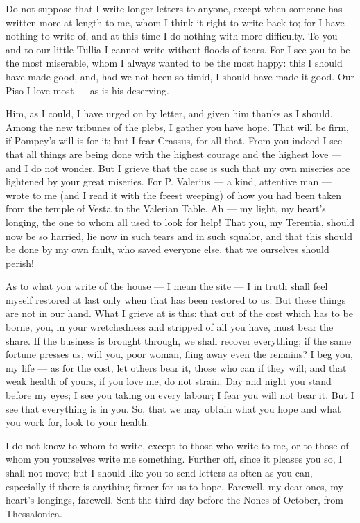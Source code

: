 

 Do not suppose that I write longer letters to anyone, except when someone has written more at length to me, whom I think it right to write back to; for I have nothing to write of, and at this time I do nothing with more difficulty. To you and to our little Tullia I cannot write without floods of tears. For I see you to be the most miserable, whom I always wanted to be the most happy: this I should have made good, and, had we not been so timid, I should have made it good. Our Piso I love most --- as is his deserving.

 Him, as I could, I have urged on by letter, and given him thanks as I should. Among the new tribunes of the plebs, I gather you have hope. That will be firm, if Pompey's will is for it; but I fear Crassus, for all that. From you indeed I see that all things are being done with the highest courage and the highest love --- and I do not wonder. But I grieve that the case is such that my own miseries are lightened by your great miseries. For P. Valerius --- a kind, attentive man --- wrote to me (and I read it with the freest weeping) of how you had been taken from the temple of Vesta to the Valerian Table. Ah --- my light, my heart's longing, the one to whom all used to look for help! That you, my Terentia, should now be so harried, lie now in such tears and in such squalor, and that this should be done by my own fault, who saved everyone else, that we ourselves should perish!

 As to what you write of the house --- I mean the site --- I in truth shall feel myself restored at last only when that has been restored to us. But these things are not in our hand. What I grieve at is this: that out of the cost which has to be borne, you, in your wretchedness and stripped of all you have, must bear the share. If the business is brought through, we shall recover everything; if the same fortune presses us, will you, poor woman, fling away even the remains? I beg you, my life --- as for the cost, let others bear it, those who can if they will; and that weak health of yours, if you love me, do not strain. Day and night you stand before my eyes; I see you taking on every labour; I fear you will not bear it. But I see that everything is in you. So, that we may obtain what you hope and what you work for, look to your health.

 I do not know to whom to write, except to those who write to me, or to those of whom you yourselves write me something. Further off, since it pleases you so, I shall not move; but I should like you to send letters as often as you can, especially if there is anything firmer for us to hope. Farewell, my dear ones, my heart's longings, farewell. Sent the third day before the Nones of October, from Thessalonica.
